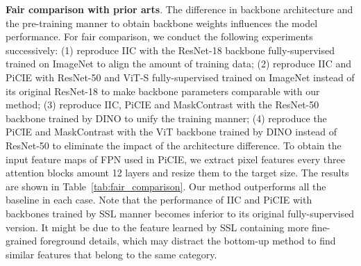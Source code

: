 \documentclass[runningheads]{llncs}
\newcommand{\PAR}[1]{\smallskip \noindent \textbf{#1}}
\begin{document}
\PAR{Fair comparison with prior arts}. The difference in backbone architecture and the pre-training manner to obtain backbone weights influences the model performance. For fair comparison, we conduct the following experiments successively: (1) reproduce IIC with the ResNet-18 backbone fully-supervised trained on ImageNet to align the amount of training data; (2) reproduce IIC and PiCIE with ResNet-50 and ViT-S fully-supervised trained on ImageNet instead of its original ResNet-18 to make backbone parameters comparable with our method; (3) reproduce IIC, PiCIE and MaskContrast with the ResNet-50 backbone trained by DINO to unify the training manner; (4) reproduce the PiCIE and MaskContrast with the ViT backbone trained by DINO instead of ResNet-50 to eliminate the impact of the architecture difference. To obtain the input feature maps of FPN used in PiCIE, we extract pixel features every three attention blocks amount 12 layers and resize them to the target size. The results are shown in Table~\ref{tab:fair_comparison}. Our method outperforms all the baseline in each case. Note that the performance of IIC and PiCIE with backbones trained by SSL manner becomes inferior to its original fully-supervised version. It might be due to the feature learned by SSL containing more fine-grained foreground details, which may distract the bottom-up method to find similar features that belong to the same category.
\end{document}

